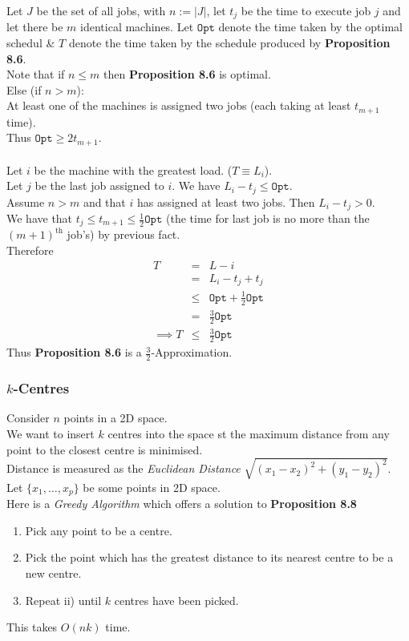 \documentclass[11pt,a4paper]{article}
\begin{document}
Let $J$ be the set of all jobs, with $n:=|J|$, let $t_j$ be the time to execute job $j$ and let there be $m$ identical machines.
Let $\mathtt{Opt}$ denote the time taken by the optimal schedul \& $T$ denote the time taken by the  schedule produced by \textbf{Proposition 8.6}.\\
Note that if $n\leq m$ then \textbf{Proposition 8.6} is optimal.\\
Else (if $n>m$):\\
At least one of the machines is assigned two jobs (each taking at least $t_{m+1}$ time).\\
Thus $\mathtt{Opt}\geq 2t_{m+1}$.\\
\\
Let $i$ be the machine with the greatest load. (\ie $T\equiv L_i$).\\
Let $j$ be the last job assigned to $i$. We have $L_i-t_j\leq\mathtt{Opt}$.\\
Assume $n>m$ and that $i$ has assigned at least two jobs. Then $L_i-t_j>0$.\\
We have that $t_j\leq t_{m+1}\leq\frac12\mathtt{Opt}$ (\ie the time for last job is no more than the $(m+1)^\text{th}$ job's) by previous fact.\\
Therefore
\[\begin{array}{rcl}
T&=&L-i\\
&=&L_i-t_j+t_j\\
&\leq&\mathtt{Opt}+\frac12\mathtt{Opt}\\
&=&\frac32\mathtt{Opt}\\
\implies T&\leq&\frac32\mathtt{Opt}
\end{array}\]
Thus \textbf{Proposition 8.6} is a $\frac32$-Approximation.

\subsubsection{$k$-Centres}

Consider $n$ points in a 2D space.\\
We want to insert $k$ centres into the space st the maximum distance from any point to the closest centre is minimised.\\
\nb Distance is measured as the \textit{Euclidean Distance} $\sqrt{(x_1-x_2)^2+(y_1-y_2)^2}$.\\

Let $\{x_1,\dots,x_p\}$ be some points in 2D space.\\
Here is a \textit{Greedy Algorithm} which offers a solution to \textbf{Proposition 8.8}
\begin{enumerate}
	\item Pick any point to be a centre.
	\item Pick the point which has the greatest distance to its nearest centre to be a new centre.
	\item Repeat ii) until $k$ centres have been picked.
\end{enumerate}
This takes $O(nk)$ time.\\
\end{document}
